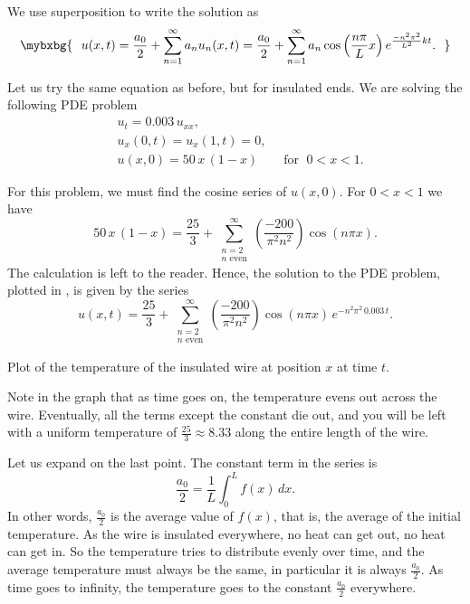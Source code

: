 We use superposition to write the solution as
\begin{equation*}
\mybxbg{~~
u(x,t) = 
\frac{a_0}{2} + 
\sum_{n=1}^\infty
a_n
u_n(x,t)
=
\frac{a_0}{2} + 
\sum_{n=1}^\infty
a_n
\cos \left( \frac{n \pi}{L} x \right)
e^{\frac{-n^2 \pi^2}{L^2} k t} .
~~}
\end{equation*}

\begin{example}
Let us try the same equation as before, but for insulated ends.
We are solving the following PDE problem
\begin{align*}
& u_t = 0.003 \, u_{xx} , \\
& u_x(0,t) = u_x(1,t) = 0 , \\
& u(x,0) = 50\,x\,(1-x) \qquad \text{for } \; 0 < x < 1 .
\end{align*}
\end{example}

\begin{exampleSol}
For this problem, we must find the cosine series of $u(x,0)$.
For $0 < x < 1$ we have
\begin{equation*}
50\, x\,(1-x)
=
\frac{25}{3} +
\sum_{\substack{n=2 \\ n \text{ even}}}^\infty
\left( \frac{-200}{\pi^2 n^2} \right)
\cos (n \pi x) .
\end{equation*}
The calculation is left to the reader.
Hence, the solution to the PDE problem, plotted in
, is given by the series
\begin{equation*}
u(x,t)
=
\frac{25}{3} +
\sum_{\substack{n=2 \\ n \text{ even}}}^\infty
\left( \frac{-200}{\pi^2 n^2} \right)
\cos ( n \pi x)
\, e^{-n^2 \pi^2 \, 0.003 \, t} .
\end{equation*}

\begin{myfig}
\capstart
{}
\caption{Plot of the temperature of the insulated wire at position $x$
at time $t$.\label{heat:wireisolexfig}}
\end{myfig}

Note in the graph
that as time goes on, the temperature evens out across the wire.  Eventually, all the
terms except the constant
die out, and you will be left with a uniform temperature
of $\frac{25}{3} \approx 8.33$ along the entire length of the wire.
\end{exampleSol}

Let us expand on the last point.  The constant term in the series is
\begin{equation*}
\frac{a_0}{2} = \frac{1}{L} \int_0^L f(x) \, dx .
\end{equation*}
In other words, $\frac{a_0}{2}$ is the average value of $f(x)$, that is,
the average of the initial temperature.  As the wire is insulated
everywhere, no heat can get out, no heat can get in.  So the temperature
tries to distribute evenly over time, and the average temperature must always be the
same, in particular it is always $\frac{a_0}{2}$.  As time goes to
infinity, the temperature goes to the constant $\frac{a_0}{2}$ everywhere.

